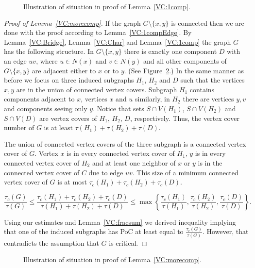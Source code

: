 \begin{figure}
	\begin{minipage}{.45\textwidth}
                \centering
      		 
		\caption*{}
        \end{minipage}
	\begin{minipage}{.45\textwidth}
                \centering
                
                \caption*{}
        \end{minipage}
        \caption{Illustration of situation in proof of Lemma~\ref{VC:1comp}.}
	\label{pic:1comp}
\end{figure}
\begin{proof}[Proof of Lemma~\ref{VC:morecomp}]
	
	If the graph \(G \setminus \{x, y\}\) is connected then we are done with the proof according to Lemma~\ref{VC:1compEdge}.
	By Lemma~\ref{VC:Bridge}, Lemma~\ref{VC:Char} and Lemma~\ref{VC:1comp} the graph \(G\) has the following structure.
	In \(G\setminus \{x, y\}\) there is exactly one component \(D\) with an edge \(uv\), where \(u \in N(x)\) and \(v \in N(y)\)
	and all other components of \(G \setminus \{x, y\}\) are adjacent either to \(x\) or to \(y\). (See Figure~\ref{pic:morecomp}.) 
	In the same manner as before we focus on three induced subgraphs \(H_1\), \(H_2\) and \(D\) such that the vertices \(x,y\) 
	are in the union of connected vertex covers.
	Subgraph \(H_1\) contains components adjacent to \(x\), vertices \(x\) and \(u\)
	similarly, in \(H_2\) there are vertices \(y, v\) and components seeing only \(y\).
	Notice that sets \(S \cap V(H_1)\), \(S \cap V(H_2)\) and \(S \cap V(D)\) are vertex covers of \(H_1\), \(H_2\), \(D\), respectively.
	Thus, the vertex cover number of \(G\) is at least \(\tau(H_1) + \tau(H_2) + \tau(D)\).
		
	The union of connected vertex covers of the three subgraph is a connected vertex cover of \(G\).
	Vertex \(x\) is in every connected vertex cover of \(H_1\), \(y\) is in every connected vertex cover of \(H_2\) and at least one neighbor 
	of \(x\) or \(y\) is in the connected vertex cover of \(C\) due to edge \(uv\). This size of a minimum connected vertex cover of \(G\)
	is at most \(\tau_c(H_1) + \tau_c(H_2) + \tau_c(D)\).
	
	\[\frac{\tau_c(G)}{\tau(G)} \leq {\frac{\tau_c(H_1) + \tau_c(H_2) + \tau_c(D)}{\tau(H_1) + \tau(H_2) + \tau(D)}} 
	\leq {\max\left\{ \frac{\tau_c(H_1)}{\tau(H_1)}, \frac{\tau_c(H_2)}{\tau(H_2)}, \frac{\tau_c(D)}{\tau(D)}\right\}}.\]
	
	Using our estimates and Lemma~\ref{VC:fracsum} we derived inequality implying that one of the induced subgraphs has PoC at least equal to \(\frac{\tau_c(G)}{\tau(G)}\).
	However, that contradicts the assumption that \(G\) is critical.
\end{proof}

\begin{figure}
	\centering
	
        \caption{Illustration of situation in proof of Lemma~\ref{VC:morecomp}.}
        \label{pic:morecomp}
\end{figure}

